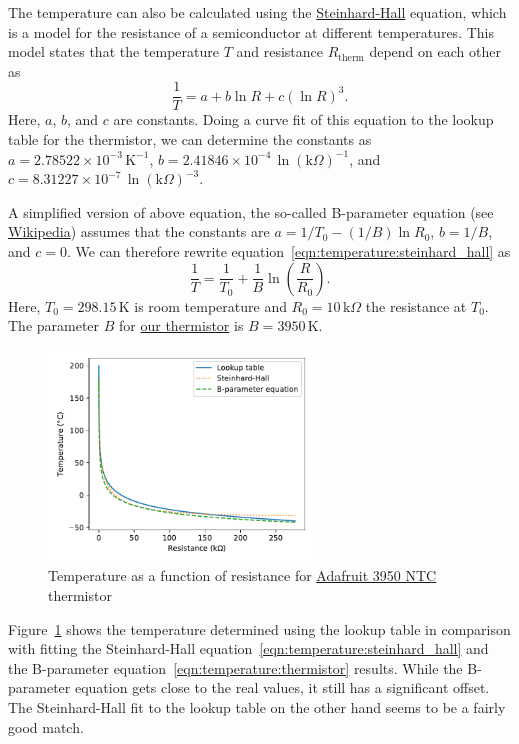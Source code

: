 The temperature can also be calculated using the \href{https://en.wikipedia.org/wiki/Steinhart%E2%80%93Hart_equation}{Steinhard-Hall} equation, which is a model for the resistance of a semiconductor at different temperatures. This model states that the temperature $T$ and resistance $R_\mathrm{therm}$ depend on each other as
\begin{equation}
    \frac{1}{T} = a + b\ln{R} + c \left(\ln{R}\right)^{3}. \label{eqn:temperature:steinhard_hall}
\end{equation}
Here, $a$, $b$, and $c$ are constants. Doing a curve fit of this equation to the lookup table for the thermistor, we can determine the constants as $a=2.78522\times10^{-3}\,\mathrm{K}^{-1}$, $b=2.41846\times10^{-4}\,\ln({\mathrm{k}\Omega})^{-1}$, and $c=8.31227\times10^{-7}\,\ln({\mathrm{k}\Omega})^{-3}$. 

A simplified version of above equation, the so-called B-parameter equation (see \href{https://en.wikipedia.org/wiki/Thermistor}{Wikipedia}) assumes that the constants are $a=1/T_0 - (1/B)\ln{R_0}$, $b=1/B$, and $c=0$. We can therefore rewrite equation~\eqref{eqn:temperature:steinhard_hall} as
\begin{equation}
    \frac{1}{T} = \frac{1}{T_0} + \frac{1}{B} \ln\left( \frac{R}{R_0} \right). \label{eqn:temperature:thermistor}
\end{equation}
Here, $T_0 = 298.15\,$K is room temperature and $R_0 = 10\,\mathrm{k}\Omega$ the resistance at $T_0$. The parameter $B$ for \href{https://www.adafruit.com/product/372}{our thermistor} is $B=3950\,$K.

\begin{figure}[tbh]
    \centering
    \includegraphics[width=0.625\textwidth]{graphics/03_temperature/thermistor.pdf}
    \caption{Temperature as a function of resistance for \href{https://www.adafruit.com/product/372}{Adafruit 3950 NTC} thermistor}
    \label{fig:temperature:thermistor}
\end{figure}
Figure~\ref{fig:temperature:thermistor} shows the temperature determined using the lookup table in comparison with fitting the Steinhard-Hall equation~\eqref{eqn:temperature:steinhard_hall} and the B-parameter equation~\eqref{eqn:temperature:thermistor} results. While the B-parameter equation gets close to the real values, it still has a significant offset. The Steinhard-Hall fit to the lookup table on the other hand seems to be a fairly good match.

